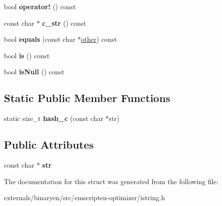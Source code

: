 \begin{DoxyCompactItemize}
bool {\bfseries operator!} () const
\item 
\mbox{\label{structcashew_1_1_i_string_a89ddc039fb636af8635aa384ab0a3d19}} 
const char $\ast$ {\bfseries c\+\_\+str} () const
\item 
\mbox{\label{structcashew_1_1_i_string_a8d4f1a92abd7285800e2d7cffab5d299}} 
bool {\bfseries equals} (const char $\ast$\mbox{\hyperlink{structother}{other}}) const
\item 
\mbox{\label{structcashew_1_1_i_string_ad1bcd73ff326722ea3cca35a50612104}} 
bool {\bfseries is} () const
\item 
\mbox{\label{structcashew_1_1_i_string_ac837d8536fc26db0d58da5ae0fc97a0e}} 
bool {\bfseries is\+Null} () const
\end{DoxyCompactItemize}
\subsection*{Static Public Member Functions}
\begin{DoxyCompactItemize}
\item 
\mbox{\label{structcashew_1_1_i_string_ab6783487c0bedf566baea732caccb65b}} 
static size\+\_\+t {\bfseries hash\+\_\+c} (const char $\ast$str)
\end{DoxyCompactItemize}
\subsection*{Public Attributes}
\begin{DoxyCompactItemize}
\item 
\mbox{\label{structcashew_1_1_i_string_a9aee3c5c091ced988a86c6f0a253e506}} 
const char $\ast$ {\bfseries str}
\end{DoxyCompactItemize}


The documentation for this struct was generated from the following file\+:\begin{DoxyCompactItemize}
\item 
externals/binaryen/src/emscripten-\/optimizer/istring.\+h\end{DoxyCompactItemize}
